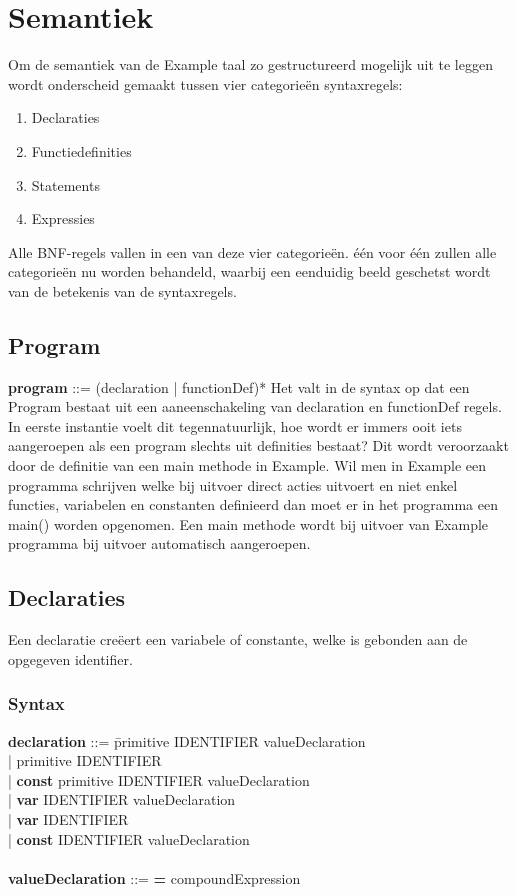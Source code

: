 \chapter{Semantiek}
Om de semantiek van de Example taal zo gestructureerd mogelijk uit te leggen wordt onderscheid gemaakt tussen vier categorie\"{e}n syntaxregels:
\begin{enumerate}
\item Declaraties
\item Functiedefinities
\item Statements
\item Expressies
\end{enumerate}
Alle BNF-regels vallen in een van deze vier categorie\"{e}n. \'{e}\'{e}n voor \'{e}\'{e}n zullen alle categorie\"{e}n nu worden behandeld, waarbij een eenduidig beeld geschetst wordt van de betekenis van de syntaxregels.

\section{Program}
{\bf program}                     ::= (declaration | functionDef)*
Het valt in de syntax op dat een Program bestaat uit een aaneenschakeling van declaration en functionDef regels. In eerste instantie voelt dit tegennatuurlijk, hoe wordt er immers ooit iets aangeroepen als een program slechts uit definities bestaat? Dit wordt veroorzaakt door de definitie van een main methode in Example. Wil men in Example een programma schrijven welke bij uitvoer direct acties uitvoert en niet enkel functies, variabelen en constanten definieerd dan moet er in het programma een main() worden opgenomen. Een main methode wordt bij uitvoer van Example programma bij uitvoer automatisch aangeroepen.

\section{Declaraties}
Een declaratie cre\"{e}ert een variabele of constante, welke is gebonden aan de opgegeven identifier.
    \subsection{Syntax}    
        \begin{tabbing}
            {\bf declaration}         ::= \=primitive IDENTIFIER valueDeclaration\\
                                      \>| primitive IDENTIFIER\\
                                      \>| \textbf{const} primitive IDENTIFIER valueDeclaration\\
                                      \>| \textbf{var} IDENTIFIER valueDeclaration\\
                                      \>| \textbf{var} IDENTIFIER\\
                                      \>| \textbf{const} IDENTIFIER valueDeclaration\\
            \\
            {\bf valueDeclaration}    ::= \textbf{=} compoundExpression\\
        \end{tabbing}
